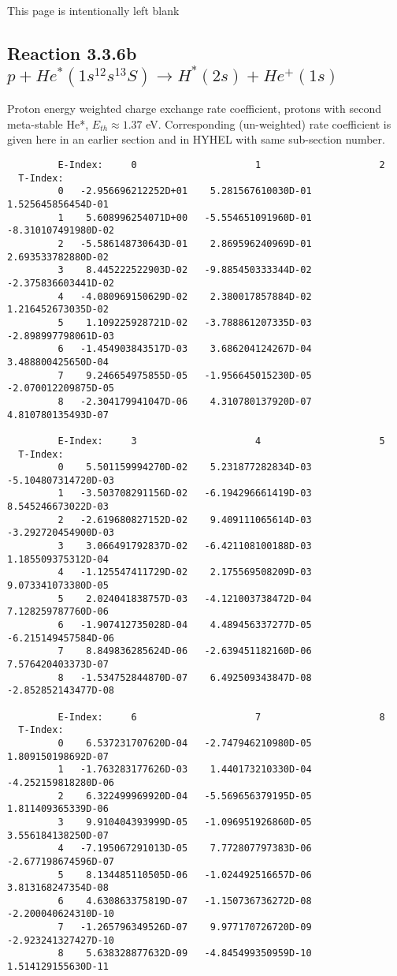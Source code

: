 \documentclass[12pt,dvipdfmx]{article}
\begin{document}
\newpage
This page is intentionally left blank
\newpage

\subsection{
Reaction 3.3.6b  $  p + He^*(1s^12s^13S) \rightarrow H^*(2s) + He^+(1s)$
}
Proton energy weighted charge exchange rate coefficient,
protons with second meta-stable He*, $E_{th} \approx 1.37$ eV.
Corresponding (un-weighted) rate coefficient is given here in an earlier section and in HYHEL with same sub-section number.

\begin{small}\begin{verbatim}
         E-Index:     0                     1                     2
  T-Index:
         0   -2.956696212252D+01    5.281567610030D-01    1.525645856454D-01
         1    5.608996254071D+00   -5.554651091960D-01   -8.310107491980D-02
         2   -5.586148730643D-01    2.869596240969D-01    2.693533782880D-02
         3    8.445222522903D-02   -9.885450333344D-02   -2.375836603441D-02
         4   -4.080969150629D-02    2.380017857884D-02    1.216452673035D-02
         5    1.109225928721D-02   -3.788861207335D-03   -2.898997798061D-03
         6   -1.454903843517D-03    3.686204124267D-04    3.488800425650D-04
         7    9.246654975855D-05   -1.956645015230D-05   -2.070012209875D-05
         8   -2.304179941047D-06    4.310780137920D-07    4.810780135493D-07

         E-Index:     3                     4                     5
  T-Index:
         0    5.501159994270D-02    5.231877282834D-03   -5.104807314720D-03
         1   -3.503708291156D-02   -6.194296661419D-03    8.545246673022D-03
         2   -2.619680827152D-02    9.409111065614D-03   -3.292720454900D-03
         3    3.066491792837D-02   -6.421108100188D-03    1.185509375312D-04
         4   -1.125547411729D-02    2.175569508209D-03    9.073341073380D-05
         5    2.024041838757D-03   -4.121003738472D-04    7.128259787760D-06
         6   -1.907412735028D-04    4.489456337277D-05   -6.215149457584D-06
         7    8.849836285624D-06   -2.639451182160D-06    7.576420403373D-07
         8   -1.534752844870D-07    6.492509343847D-08   -2.852852143477D-08

         E-Index:     6                     7                     8
  T-Index:
         0    6.537231707620D-04   -2.747946210980D-05    1.809150198692D-07
         1   -1.763283177626D-03    1.440173210330D-04   -4.252159818280D-06
         2    6.322499969920D-04   -5.569656379195D-05    1.811409365339D-06
         3    9.910404393999D-05   -1.096951926860D-05    3.556184138250D-07
         4   -7.195067291013D-05    7.772807797383D-06   -2.677198674596D-07
         5    8.134485110505D-06   -1.024492516657D-06    3.813168247354D-08
         6    4.630863375819D-07   -1.150736736272D-08   -2.200040624310D-10
         7   -1.265796349526D-07    9.977170726720D-09   -2.923241327427D-10
         8    5.638328877632D-09   -4.845499350959D-10    1.514129155630D-11


\end{verbatim}
\end{small}
\end{document}
